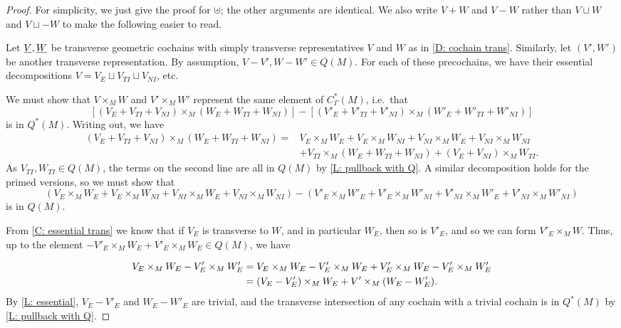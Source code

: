 \begin{proof}
	For simplicity, we just give the proof for $\uplus$; the other arguments are identical.
	We also write $V+W$ and $V-W$ rather than $V \sqcup W$ and $V\sqcup-W$ to make the following easier to read.

	Let $\underline{V},\underline{W}$ be transverse geometric cochains with simply transverse representatives $V$ and $W$ as in \cref{D: cochain trans}.
	Similarly, let $(V',W')$ be another transverse representation.
	By assumption, $V-V', W-W' \in Q(M)$.
	For each of these precochains, we have their essential decompositions $V = V_E \sqcup V_{TI} \sqcup V_{NI}$, etc.

	We must show that $V \times_M W$ and $V' \times_M W'$ represent the same element of $C^*_\Gamma(M)$, i.e.\ that
	$$[(V_E+V_{TI}+V_{NI}) \times_M (W_E+W_{TI}+W_{NI})] - [(V'_E+V'_{TI}+V'_{NI}) \times_M (W'_E+W'_{TI}+W'_{NI})]$$
	is in $Q^*(M)$.
	Writing out, we have
	\begin{align*}(V_E+V_{TI}+V_{NI}) \times_M (W_E+W_{TI}+W_{NI}) = &V_E \times_M W_E+V_E \times_M W_{NI}+V_{NI} \times_M W_E+V_{NI} \times_M W_{NI}\\
		&+V_{TI} \times_M (W_E+W_{TI}+W_{NI})+(V_E+V_{NI}) \times_M W_{TI}.
	\end{align*}
	As $V_{TI},W_{TI} \in Q(M)$, the terms on the second line are all in $Q(M)$ by \cref{L: pullback with Q}.
	A similar decomposition holds for the primed versions, so we must show that
	\begin{equation}\label{E: intersect}
		(V_E \times_M W_E+V_E \times_M W_{NI}+V_{NI} \times_M W_E+V_{NI} \times_M W_{NI})-(V'_E \times_M W'_E+V'_E \times_M W'_{NI}+V'_{NI} \times_M W'_E+V'_{NI} \times_M W'_{NI})
	\end{equation}
	is in $Q(M)$.

	From \cref{C: essential trans} we know that if $V_E$ is transverse to $W$, and in particular $W_E$, then so is $V'_E$, and so we can form $V'_E \times_M W$.
	Thus, up to the element $-V'_E \times_M W_E+V'_E \times_M W_E \in Q(M)$, we have

	\begin{align}
		V_E \times_M W_E -V'_E \times_M W'_E& = V_E \times_M W_E-V'_E \times_M W_E+V'_E \times_M W_E-V'_E \times_M W'_E\notag\\
		& = (V_E-V'_E) \times_M W_E+V' \times_M (W_E-W'_E).\label{E: transfer}
	\end{align}
	By \cref{L: essential}, $V_E-V'_E$ and $W_E-W'_E$ are trivial, and the transverse intersection of any cochain with a trivial cochain is in $Q^*(M)$ by
	\cref{L: pullback with Q}.


\end{proof}
